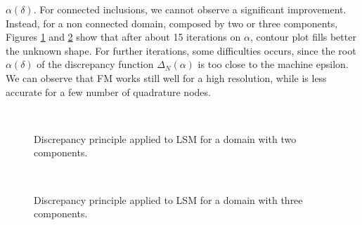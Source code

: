 \documentclass[10pt, a4paper, twoside, openright]{book}
\theoremstyle{definition}
\theoremstyle{plain}
\theoremstyle{plain}
\theoremstyle{plain}
\theoremstyle{plain}
\theoremstyle{plain}
\theoremstyle{plain}
\theoremstyle{plain}
\theoremstyle{plain}
\begin{document}
$\alpha(\delta)$. For connected inclusions, we cannot observe a significant improvement. 
Instead, for a non connected domain, composed by two or three components, Figures \ref{fig:discrepancy_two_ellipse} 
and \ref{fig:discrepancy_three_ellipse}
show that after about 15 iterations on $\alpha$, contour plot fills better the unknown shape.
For further iterations, some difficulties occurs, since the root $\alpha(\delta)$ of the discrepancy 
function $\Delta_N(\alpha)$ is too close to the machine epsilon. 
We can observe that FM works still well for a high resolution, while is less accurate for a few 
number of quadrature nodes.
\begin{center}
\begin{figure}%
\\
\caption{Discrepancy principle applied to LSM for a domain with two components.}
\label{fig:discrepancy_two_ellipse}
\end{figure}
\end{center}

\begin{center}
\begin{figure}%
\\
\caption{Discrepancy principle applied to LSM for a domain with three components.}
\label{fig:discrepancy_three_ellipse}
\end{figure}
\end{center}
\end{document}
